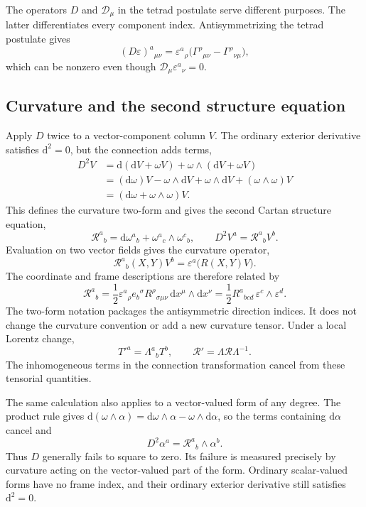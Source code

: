 \documentclass[11pt,a4paper]{article}
\numberwithin{equation}{section}
\newcommand{\dd}{\mathrm d}
\begin{document}
The operators \(D\) and \(\mathcal D_\mu\) in the tetrad postulate
serve different purposes. The latter differentiates every component
index. Antisymmetrizing the tetrad postulate gives
\[
 (D\varepsilon)^a{}_{\mu\nu}
 =\varepsilon^a{}_\rho
   \bigl(\Gamma^\rho{}_{\mu\nu}-\Gamma^\rho{}_{\nu\mu}\bigr),
\]
which can be nonzero even though
\(\mathcal D_\mu\varepsilon^a{}_\nu=0\).

\subsection{Curvature and the second structure equation}

Apply \(D\) twice to a vector-component column \(V\). The ordinary
exterior derivative satisfies \(\dd^2=0\), but the connection adds
terms,
\begin{align*}
 D^2V
 &=\dd(\dd V+\omega V)+\omega\wedge(\dd V+\omega V)\\
 &=(\dd\omega)V-\omega\wedge\dd V
            +\omega\wedge\dd V+(\omega\wedge\omega)V\\
 &=(\dd\omega+\omega\wedge\omega)V.
\end{align*}
This defines the curvature two-form and gives the second Cartan
structure equation,
\begin{equation}
 \boxed{\mathcal R^a{}_b
       =\dd\omega^a{}_b+\omega^a{}_c\wedge\omega^c{}_b,}
 \qquad D^2V^a=\mathcal R^a{}_bV^b.
 \label{gr2:eq:cartan-curvature}
\end{equation}
Evaluation on two vector fields gives the curvature operator,
\[
 \mathcal R^a{}_b(X,Y)V^b
 =\varepsilon^a\bigl(R(X,Y)V\bigr).
\]
The coordinate and frame descriptions are therefore related by
\begin{equation}
 \mathcal R^a{}_b
 =\frac12\varepsilon^a{}_\rho e_b{}^\sigma
 R^\rho{}_{\sigma\mu\nu}\,\dd x^\mu\wedge\dd x^\nu
 =\frac12R^a{}_{bcd}\,\varepsilon^c\wedge\varepsilon^d.
 \label{gr2:eq:curvature-form-components}
\end{equation}
The two-form notation packages the antisymmetric direction indices.
It does not change the curvature convention or add a new curvature
tensor. Under a local Lorentz change,
\[
 T'^a=\Lambda^a{}_bT^b,
 \qquad
 \mathcal R'=\Lambda\mathcal R\Lambda^{-1}.
\]
The inhomogeneous terms in the connection transformation cancel from
these tensorial quantities.

The same calculation also applies to a vector-valued form of any
degree. The product rule gives
\(\dd(\omega\wedge\alpha)=\dd\omega\wedge\alpha
-\omega\wedge\dd\alpha\), so the terms containing
\(\dd\alpha\) cancel and
\[
 D^2\alpha^a=\mathcal R^a{}_b\wedge\alpha^b.
\]
Thus \(D\) generally fails to square to zero. Its failure is measured
precisely by curvature acting on the vector-valued part of the form.
Ordinary scalar-valued forms have no frame index, and their ordinary
exterior derivative still satisfies \(\dd^2=0\).
\end{document}
